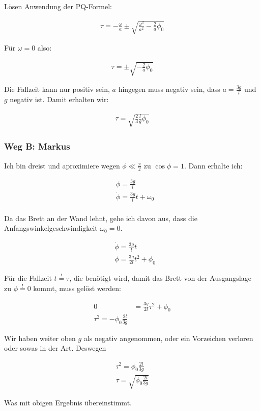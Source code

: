 \documentclass[a4paper,german,12pt,smallheadings]{scrartcl}
\begin{document}
Lösen Anwendung der PQ-Formel:

\begin{align*}
  \tau = -\frac{\omega}{a} \pm \sqrt{\frac{\omega^2}{a^2} - \frac{2}{a} \phi_0}
\end{align*}

Für $\omega = 0$ also:

\begin{align*}
  \tau = \pm \sqrt{- \frac{2}{a} \phi_0}
\end{align*}

Die Fallzeit kann nur positiv sein, $a$ hingegen muss negativ sein, dass $a = \frac{3g}{l}$ und $g$ negativ ist. Damit erhalten wir:

\begin{align*}
  \tau = \sqrt{\frac{2}{3} \frac{l}{g} \phi_0}
\end{align*}

\subsubsection*{Weg B: Markus}

Ich bin dreist und aproximiere wegen $\phi \ll \frac{\pi}{2}$ zu $\cos \phi = 1$. Dann erhalte ich:

\begin{align*}
  &\ddot{\phi} = \frac{3g}{l} \\
  &\dot{\phi} = \frac{3g}{l}t + \omega_0 \\
\end{align*}

Da das Brett an der Wand lehnt, gehe ich davon aus, dass die Anfangswinkelgeschwindigkeit $\omega_0 = 0$.

\begin{align*}
  &\dot{\phi} = \frac{3g}{l}t\\
  &\phi = \frac{3g}{2l} t^2 + \phi_0
\end{align*}

Für die Fallzeit $t \overset{!}{=} \tau$, die benötigt wird, damit das Brett von der
Ausgangslage zu $\phi \overset{!}{=} 0$ kommt, muss gelöst werden:

\begin{align*}
  0 &= \frac{3g}{2l} \tau^2 + \phi_0 \\
  \tau^2 = -\phi_0 \frac{2l}{3g}
\end{align*}

Wir haben weiter oben $g$ als negativ angenommen, oder ein Vorzeichen verloren oder sowas in der Art. Deswegen

\begin{align*}
  \tau^2 = \phi_0 \frac{2l}{3g} \\
  \tau = \sqrt{\phi_0 \frac{2l}{3g}}
\end{align*}

Was mit obigen Ergebnis übereinstimmt.
\end{document}

